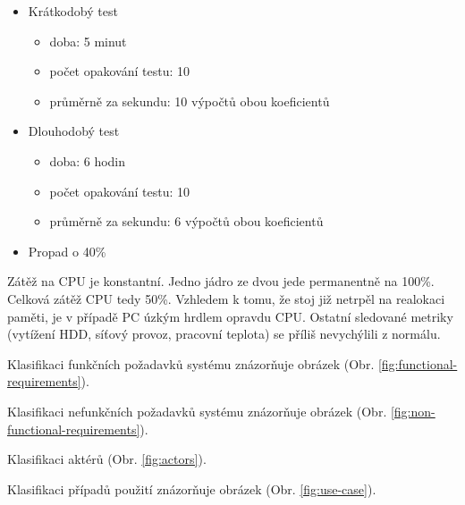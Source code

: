 \begin{itemize}
	\setlength{\parskip}{0pt}
	\setlength{\itemsep}{0pt}
	\item {Krátkodobý test}
	\begin{itemize}
		\setlength{\parskip}{0pt}
		\setlength{\itemsep}{0pt}
		\item {doba: 5 minut}
		\item {počet opakování testu: 10}
		\item {průměrně za sekundu: 10 výpočtů obou koeficientů}
	\end{itemize}
	\item {Dlouhodobý test}
	\begin{itemize}
		\setlength{\parskip}{0pt}
		\setlength{\itemsep}{0pt}
		\item {doba: 6 hodin}
		\item {počet opakování testu: 10}
		\item {průměrně za sekundu: 6 výpočtů obou koeficientů}
	\end{itemize}
	\item {Propad o 40\%}
\end{itemize}

Zátěž na CPU je konstantní. Jedno jádro ze dvou jede permanentně na 100\%. Celková zátěž CPU tedy 50\%. Vzhledem k tomu, že stoj již netrpěl na realokaci paměti, je v případě PC úzkým hrdlem opravdu CPU. Ostatní sledované metriky (vytížení HDD, síťový provoz, pracovní teplota) se příliš nevychýlili z normálu.



Klasifikaci funkčních požadavků systému znázorňuje obrázek (Obr. \ref{fig:functional-requirements}).

Klasifikaci nefunkčních požadavků systému znázorňuje obrázek (Obr. \ref{fig:non-functional-requirements}).

Klasifikaci aktérů (Obr. \ref{fig:actors}).

Klasifikaci případů použití znázorňuje obrázek (Obr. \ref{fig:use-case}).

